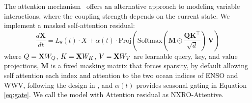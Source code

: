 The attention mechanism~\cite{vaswani2017attention} offers an alternative approach to modeling variable interactions, where the coupling strength depends on the current state. We implement a masked self-attention residual: %
\begin{equation}
    \frac{d\mathbf{X}}{dt} = L_\theta(t)\cdot X + \alpha(t)\cdot \text{Proj}\left(\text{Softmax}\left(\mathbf{M} \odot \frac{\mathbf{Q}\mathbf{K}^\top}{\sqrt{d}}\right)\,\mathbf{V}\right)
\end{equation}
where $Q = \mathbf{X} W_Q$, $K = \mathbf{X} W_K$, $V = \mathbf{X} W_V$ are learnable query, key, and value projections, $\mathbf{M}$ is a fixed masking matrix that forces sparsity, by default allowing self attention each index and attention to the two ocean indices of ENSO and WWV, following the design in \cite{zhao2024xro}, and $\alpha(t)$ provides seasonal gating in Equation \ref{eq:gate}. We call the model with Attention residual as NXRO-Attentive. %
